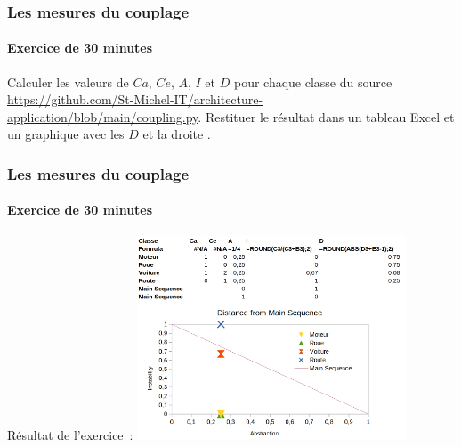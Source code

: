 \documentclass{beamer}
\begin{document}
    \begin{frame}
        \transdissolve
        \frametitle{Les mesures du couplage}
        \framesubtitle{Exercice \execcounterdispinc{} de 30 minutes}
        Calculer les valeurs de $Ca$, $Ce$, $A$, $I$ et $D$ pour chaque classe du source \url{https://github.com/St-Michel-IT/architecture-application/blob/main/coupling.py}.
        \bigbreak
        Restituer le résultat dans un tableau Excel et un graphique avec les $D$ et la droite .
    \end{frame}

    \begin{frame}
        \transdissolve
        \frametitle{Les mesures du couplage}
        \framesubtitle{Exercice \execcounterdispinc{} de 30 minutes}
        Résultat de l'exercice~:
        \bigbreak
        \centering
        \includegraphics[width=8cm]{image/exercice-metrics-1}
    \end{frame}
\end{document}
